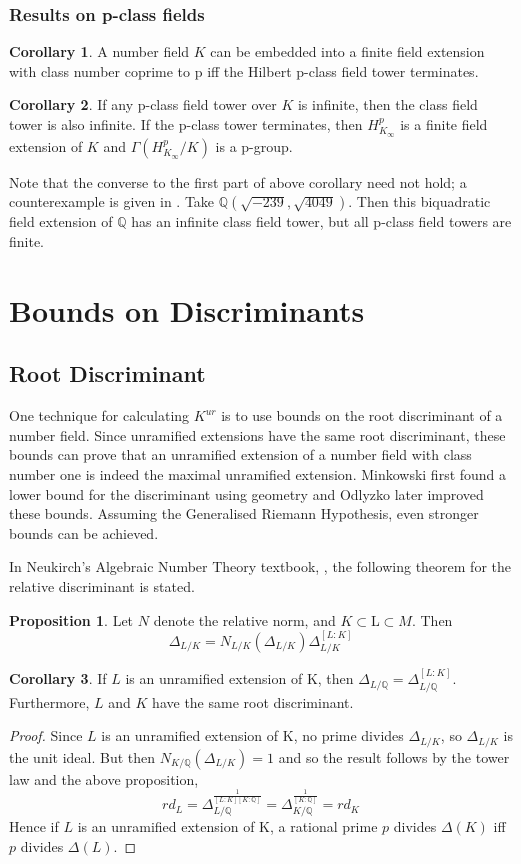 \documentclass[12pt]{extarticle}
\newcommand{\Q}{\mathbb{Q}}
\newcommand{\<}{\langle}
\renewcommand{\>}{\rangle}
\theoremstyle{definition}
\newtheorem{corollary}{Corollary}
\newtheorem{proposition}{Proposition}
\begin{document}
\subsubsection{Results on p-class fields }
\begin{corollary}
 A number field $K$ can be embedded into a finite field extension with class number coprime to p iff the Hilbert p-class field tower terminates.
\end{corollary}
\begin{corollary}
If any p-class field tower over $K$ is infinite, then the class field tower is also infinite. If the p-class tower terminates, then $H_{K_\infty}^{p}$ is a finite field extension of $K$ and $\Gamma(H_{K_\infty}^{p}/K)$ is a p-group.
\end{corollary}
Note that the converse to the first part of above corollary need not hold; a counterexample is given in \cite{SCHO}. Take $\Q\left(\sqrt{-239},\sqrt{4049}\right)$. Then this biquadratic field extension of $\Q$ has an infinite class field tower, but all p-class field towers are finite.
\section{Bounds on Discriminants}
\subsection{Root Discriminant}
One technique for calculating $K^{ur}$ is to use bounds on the root discriminant of a number field. Since unramified extensions have the same root discriminant, these bounds can prove that an unramified extension of a number field with class number one is indeed the maximal unramified extension. Minkowski first found a lower bound for the discriminant using geometry and Odlyzko later improved these bounds. Assuming the Generalised Riemann Hypothesis, even stronger bounds can be achieved. \par
In Neukirch's Algebraic Number Theory textbook, \cite{NEUK}, the following theorem for the relative discriminant is stated. 
\begin{proposition}
Let $N$ denote the relative norm, and $K\subset $L$ \subset M $. Then \begin{equation}
    \Delta_{L/K} = N_{L/K}(\Delta_{L/K})\Delta_{L/K}^{[L:K]}
\end{equation}
\end{proposition}
\begin{corollary}
 If $L$ is an unramified extension of K, then $\Delta_{L/\Q}= \Delta_{L/\Q}^{[L:K]}$. Furthermore, $L$ and $K$ have the same root discriminant.
\end{corollary}
\begin{proof}
Since $L$ is an unramified extension of K, no prime divides $\Delta_{L/K}$, so $\Delta_{L/K}$ is the unit ideal. But then $N_{K/\Q}(\Delta_{L/K})=1$ and so the result follows by the tower law and the above proposition, \begin{equation}
    rd_L=\Delta_{L/\Q}^\frac{1}{[L:K][K:\Q]}=\Delta_{K/\Q}^\frac{1}{[K:\Q]}= rd_K
\end{equation}
Hence if $L$ is an unramified extension of K, a rational prime $p$ divides $\Delta(K)$ iff $p$ divides $\Delta(L)$.
\end{proof}
\end{document}

